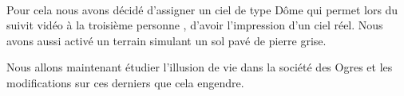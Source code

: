 \paragraph{}
Pour cela nous avons décidé d'assigner un ciel de type Dôme qui permet lors du
suivit vidéo à la troisième personne , d'avoir l'impression d'un ciel réel.
Nous avons aussi activé un terrain simulant un sol pavé de pierre grise. 

Nous allons maintenant étudier l'illusion de vie dans la société des Ogres et
les modifications sur ces derniers que cela engendre.
